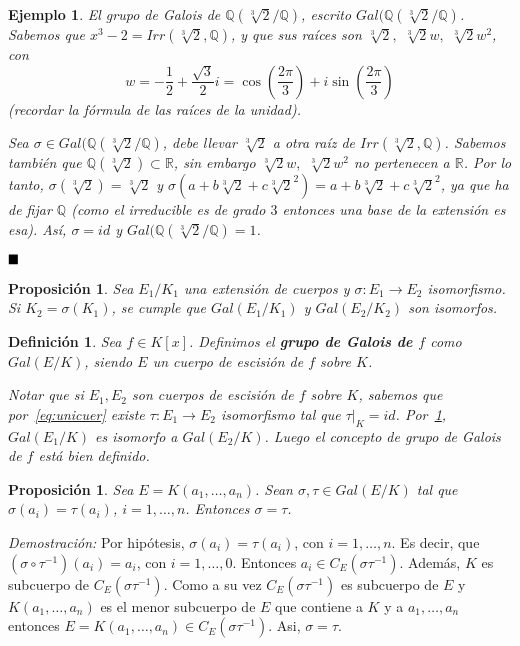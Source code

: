\documentclass[12pt]{article}
\newtheorem{proposition}[theorem]{Proposición}
\newtheorem{definition}[theorem]{Definición}
\newtheorem{example}{Ejemplo}[theorem]
\begin{document}
\begin{example} El grupo de Galois de $\mathbb{Q}(\sqrt[3]{2}/\mathbb{Q})$, escrito $Gal(\mathbb{Q}(\sqrt[3]{2}/\mathbb{Q})$. Sabemos que $x^{3}-2 = Irr(\sqrt[3]{2}, \mathbb{Q})$, y que sus raíces son $\sqrt[3]{2},$  $\sqrt[3]{2}w,$  $\sqrt[3]{2}w^{2}$, con $$w = -\dfrac{1}{2} + \dfrac{\sqrt{3}}{2}i = \cos \left( \dfrac{2\pi}{3} \right) + i\sin \left( \dfrac{2\pi}{3} \right)$$ (recordar la fórmula de las raíces de la unidad).

Sea $\sigma \in Gal(\mathbb{Q}(\sqrt[3]{2}/\mathbb{Q})$, debe llevar $\sqrt[3]{2}$ a otra raíz de $Irr(\sqrt[3]{2}, \mathbb{Q})$. Sabemos también que $\mathbb{Q}(\sqrt[3]{2}) \subset \mathbb{R}$, sin embargo $\sqrt[3]{2}w,$  $\sqrt[3]{2}w^{2}$ no pertenecen a $\mathbb{R}$. Por lo tanto, $\sigma (\sqrt[3]{2}) = \sqrt[3]{2}$ y $\sigma (a + b\sqrt[3]{2} + c\sqrt[3]{2}^{2}) = a + b\sqrt[3]{2} + c\sqrt[3]{2}^{2}$, ya que ha de fijar $\mathbb{Q}$ (como el irreducible es de grado $3$ entonces una base de la extensión es esa). Así, $\sigma = id$ y $Gal(\mathbb{Q}(\sqrt[3]{2}/\mathbb{Q}) = 1$.
\end{example}

$\hfill \blacksquare$

\begin{proposition}\label{eq:ggal1} Sea $E_{1}/K_{1}$ una extensión de cuerpos y $\sigma \colon E_{1} \longrightarrow E_{2}$ isomorfismo. Si $K_{2} = \sigma (K_{1})$, se cumple que $Gal(E_{1}/K_{1})$ y $Gal(E_{2}/K_{2})$ son isomorfos.
\end{proposition}

\begin{definition} Sea $f \in K[x]$. Definimos el \textbf{grupo de Galois de $f$} como $Gal(E/K)$, siendo $E$ un cuerpo de escisión de $f$ sobre $K$.

Notar que si $E_{1}, E_{2}$ son cuerpos de escisión de $f$ sobre $K$, sabemos que por~\ref{eq:unicuer} existe $\tau \colon E_{1} \longrightarrow E_{2}$ isomorfismo tal que $\left.\tau \right|_K = id$. Por~\ref{eq:ggal1}, $Gal (E_{1}/K)$ es isomorfo a $Gal(E_{2}/K)$. Luego el concepto de grupo de Galois de $f$ está bien definido.
\end{definition}

\begin{proposition}\label{eq:gall} Sea $E = K(a_{1}, \ldots, a_{n})$. Sean $\sigma, \tau \in Gal(E/K)$ tal que $\sigma (a_{i}) = \tau (a_{i})$, $i = 1, \ldots, n$. Entonces $\sigma = \tau$.
\end{proposition}
\emph{Demostración: } 
Por hipótesis, $\sigma(a_{i}) = \tau (a_{i})$, con $i = 1, \ldots, n$. Es decir, que $(\sigma \circ \tau^{-1})(a_{i}) = a_{i}$, con $i = 1, \ldots, 0$. Entonces $a_{i}\in C_{E}(\sigma \tau^{-1})$. Además, $K$ es subcuerpo de $C_{E}(\sigma \tau^{-1})$. Como a su vez $C_{E}(\sigma \tau^{-1})$ es subcuerpo de $E$ y $K(a_{1}, \ldots, a_{n})$ es el menor subcuerpo de $E$ que contiene a $K$ y a $a_{1}, \ldots, a_{n}$ entonces $E = K(a_{1}, \ldots, a_{n}) \in C_{E}(\sigma \tau^{-1})$. Asi, $\sigma = \tau$.
\end{document}
